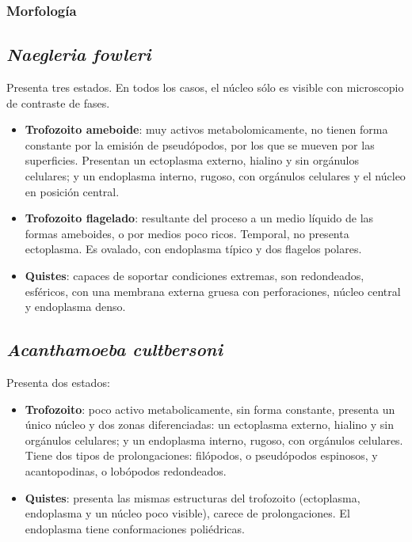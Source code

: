 \subsubsection{Morfología}
\begin{multicols}{2}
	\subsection{\textit{Naegleria fowleri}}
	Presenta tres estados. En todos los casos, el núcleo sólo es visible con microscopio de contraste de fases.
	\begin{itemize}[itemsep=0pt,parsep=0pt,topsep=0pt,partopsep=0pt]
		\item\textbf{Trofozoito ameboide}: muy activos metabolomicamente, no tienen forma constante por la emisión de pseudópodos, por los que se mueven por las superficies. Presentan un ectoplasma externo, hialino y sin orgánulos celulares; y un endoplasma interno, rugoso, con orgánulos celulares y el núcleo en posición central.
		\item\textbf{Trofozoito flagelado}: resultante del proceso a un medio líquido de las formas ameboides, o por medios poco ricos. Temporal, no presenta ectoplasma. Es ovalado, con endoplasma típico y dos flagelos polares.
		\item\textbf{Quistes}: capaces de soportar condiciones extremas, son redondeados, esféricos, con una membrana externa gruesa con perforaciones, núcleo central y endoplasma denso.
	\end{itemize}
	\columnbreak
	\subsection{\textit{Acanthamoeba cultbersoni}}
	Presenta dos estados:
	\begin{itemize}[itemsep=0pt,parsep=0pt,topsep=0pt,partopsep=0pt]
		\item\textbf{Trofozoito}: poco activo metabolicamente, sin forma constante, presenta un único núcleo y dos zonas diferenciadas: un ectoplasma externo, hialino y sin orgánulos celulares; y un endoplasma interno, rugoso, con orgánulos celulares. Tiene dos tipos de prolongaciones: filópodos, o pseudópodos espinosos, y acantopodinas, o lobópodos redondeados.
		\item\textbf{Quistes}: presenta las mismas estructuras del trofozoito (ectoplasma, endoplasma y un núcleo poco visible), carece de prolongaciones. El endoplasma tiene conformaciones poliédricas.
	\end{itemize}
\end{multicols}
